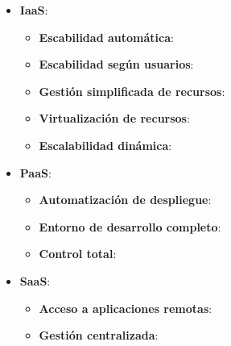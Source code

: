 

\begin{solution}
	\begin{itemize}
		\item \textbf{IaaS}: 
			\begin{itemize}
				\item \textbf{Escabilidad automática}: 
				\item \textbf{Escabilidad según usuarios}: 
				\item \textbf{Gestión simplificada de recursos}: 
				\item \textbf{Virtualización de recursos}: 
				\item \textbf{Escalabilidad dinámica}: 
			\end{itemize}

		\item \textbf{PaaS}: 
			\begin{itemize}
				\item \textbf{Automatización de despliegue}: 
				\item \textbf{Entorno de desarrollo completo}: 
				\item \textbf{Control total}: 
			\end{itemize}

		\item \textbf{SaaS}: 
			\begin{itemize}
				\item \textbf{Acceso a aplicaciones remotas}: 
				\item \textbf{Gestión centralizada}: 
			\end{itemize}
	\end{itemize}

\end{solution}
